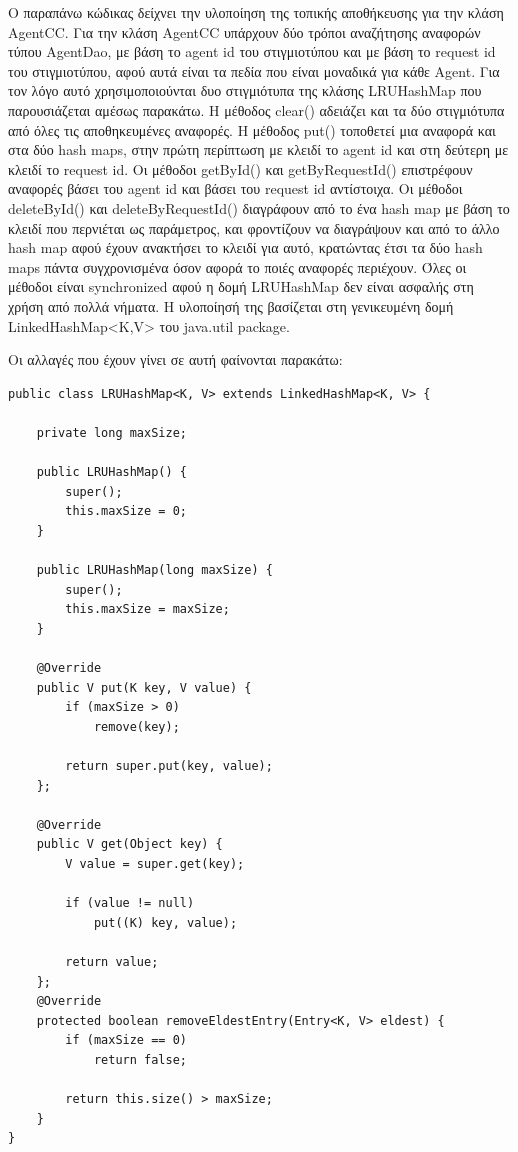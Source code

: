 \documentclass[a4paper,11pt]{article}
\begin{document}
\begin{sloppypar}
Ο παραπάνω κώδικας δείχνει την υλοποίηση της τοπικής αποθήκευσης για την κλάση AgentCC. Για την κλάση AgentCC υπάρχουν δύο τρόποι αναζήτησης αναφορών τύπου AgentDao, με βάση το agent id του στιγμιοτύπου και με βάση το request id του στιγμιοτύπου, αφού αυτά είναι τα πεδία που είναι μοναδικά για κάθε Agent. Για τον λόγο αυτό χρησιμοποιούνται δυο στιγμιότυπα της κλάσης LRUHashMap που παρουσιάζεται αμέσως παρακάτω. Η μέθοδος clear() αδειάζει και τα δύο στιγμιότυπα από όλες τις αποθηκευμένες αναφορές. Η μέθοδος put() τοποθετεί μια αναφορά και στα δύο hash maps, στην πρώτη περίπτωση με κλειδί το agent id και στη δεύτερη με κλειδί το request id. Οι μέθοδοι getById() και getByRequestId() επιστρέφουν αναφορές βάσει του agent id και βάσει του request id αντίστοιχα. Οι μέθοδοι deleteById() και deleteByRequestId() διαγράφουν από το ένα hash map με βάση το κλειδί που περνιέται ως παράμετρος, και φροντίζουν να διαγράψουν και από το άλλο hash map αφού έχουν ανακτήσει το κλειδί για αυτό, κρατώντας έτσι τα δύο hash maps πάντα συγχρονισμένα όσον αφορά το ποιές αναφορές περιέχουν. Όλες οι μέθοδοι είναι synchronized αφού η δομή LRUHashMap δεν είναι ασφαλής στη χρήση από πολλά νήματα. Η υλοποίησή της βασίζεται στη γενικευμένη δομή LinkedHashMap<K,V> του java.util package.

Οι αλλαγές που έχουν γίνει σε αυτή φαίνονται παρακάτω:

\begin{lstlisting}
public class LRUHashMap<K, V> extends LinkedHashMap<K, V> {

    private long maxSize;

    public LRUHashMap() {
        super();
        this.maxSize = 0;
    }

    public LRUHashMap(long maxSize) {
        super();
        this.maxSize = maxSize;
    }

    @Override
    public V put(K key, V value) {
        if (maxSize > 0)
            remove(key);

        return super.put(key, value);
    };

    @Override
    public V get(Object key) {
        V value = super.get(key);

        if (value != null)
            put((K) key, value);

        return value;
    };
    @Override
    protected boolean removeEldestEntry(Entry<K, V> eldest) {
        if (maxSize == 0)
            return false;

        return this.size() > maxSize;
    }
}
\end{lstlisting}


\end{sloppypar}
\end{document}
